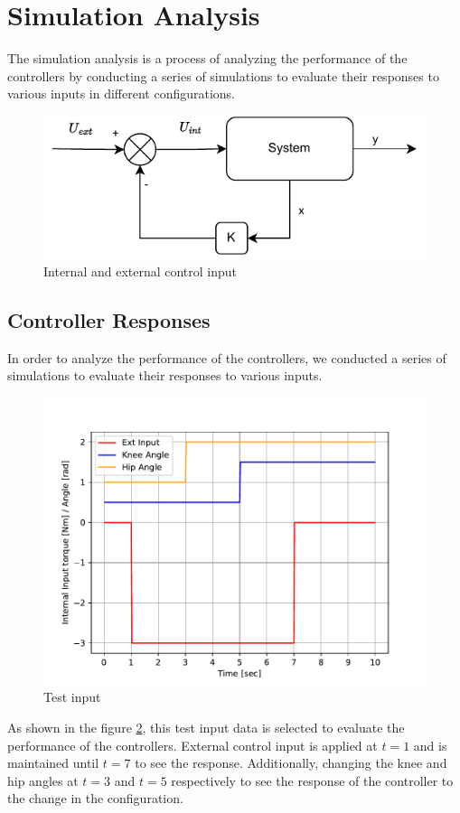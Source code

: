 \section{Simulation Analysis}
The simulation analysis is a process of analyzing the performance of the controllers by conducting a series of simulations to evaluate their responses to various inputs in different configurations.
\begin{figure}[h]
    \centering
    \includegraphics[width=.5\textwidth]{Block Diagram of State Feedback Controller_simple}
    \caption{Internal and external control input}
    \label{fig:Internal and external control input}
\end{figure}

\subsection{Controller Responses}
In order to analyze the performance of the controllers, we conducted a series of simulations to evaluate their responses to various inputs.
\begin{figure}[h]
	\centering
	\includegraphics[width=.5\textwidth]{Test Input}
	\caption{Test input}
	\label{fig:Test input}
\end{figure}

As shown in the figure \ref{fig:Test input}, this test input data is selected to evaluate the performance of the controllers. External control input is applied at $t=1$ and is maintained until $t=7$ to see the response. Additionally, changing the knee and hip angles at $t=3$ and $t=5$ respectively to see the response of the controller to the change in the configuration.
\vspace{3cm}

